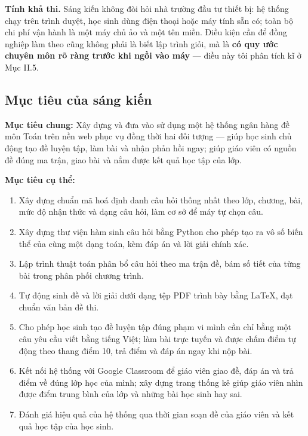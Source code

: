 \textbf{Tính khả thi.} Sáng kiến không đòi hỏi nhà trường đầu tư thiết bị: hệ
thống chạy trên trình duyệt, học sinh dùng điện thoại hoặc máy tính sẵn có;
toàn bộ chi phí vận hành là một máy chủ ảo và một tên miền. Điều kiện cần để
đồng nghiệp làm theo cũng không phải là biết lập trình giỏi, mà là \textbf{có
quy ước chuyên môn rõ ràng trước khi ngồi vào máy} --- điều này tôi phân tích
kĩ ở Mục II.5.

\subsection{Mục tiêu của sáng kiến}

\textbf{Mục tiêu chung:} Xây dựng và đưa vào sử dụng một hệ thống ngân hàng đề
môn Toán trên nền web phục vụ đồng thời hai đối tượng --- giúp học sinh chủ
động tạo đề luyện tập, làm bài và nhận phản hồi ngay; giúp giáo viên có nguồn
đề đúng ma trận, giao bài và nắm được kết quả học tập của lớp.

\textbf{Mục tiêu cụ thể:}

\begin{enumerate}[label=(\arabic*), leftmargin=1.2cm, itemsep=2pt]
  \item Xây dựng chuẩn mã hoá định danh câu hỏi thống nhất theo lớp, chương,
        bài, mức độ nhận thức và dạng câu hỏi, làm cơ sở để máy tự chọn câu.
  \item Xây dựng thư viện hàm sinh câu hỏi bằng Python cho phép tạo ra vô số
        biến thể của cùng một dạng toán, kèm đáp án và lời giải chính xác.
  \item Lập trình thuật toán phân bổ câu hỏi theo ma trận đề, bám số tiết của
        từng bài trong phân phối chương trình.
  \item Tự động sinh đề và lời giải dưới dạng tệp PDF trình bày bằng \LaTeX,
        đạt chuẩn văn bản đề thi.
  \item Cho phép học sinh tạo đề luyện tập đúng phạm vi mình cần chỉ bằng một
        câu yêu cầu viết bằng tiếng Việt; làm bài trực tuyến và được chấm điểm
        tự động theo thang điểm 10, trả điểm và đáp án ngay khi nộp bài.
  \item Kết nối hệ thống với Google Classroom để giáo viên giao đề, đáp án và
        trả điểm về đúng lớp học của mình; xây dựng trang thống kê giúp giáo
        viên nhìn được điểm trung bình của lớp và những bài học sinh hay sai.
  \item Đánh giá hiệu quả của hệ thống qua thời gian soạn đề của giáo viên và
        kết quả học tập của học sinh.
\end{enumerate}

